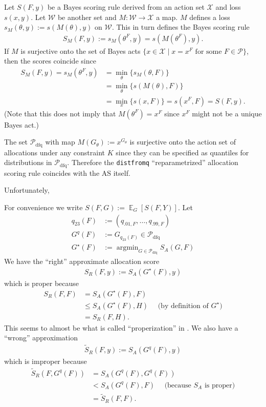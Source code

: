 \documentclass{article}
\DeclareMathOperator*{\argmin}{argmin}
\DeclareMathOperator{\Ex}{\mathbb{E}}
\begin{document}
Let $S(F,y)$ be a Bayes scoring rule derived from an action set $\mathcal{X}$ and loss $s(x,y)$.
Let $\mathcal{W}$ be another set and $M:\mathcal{W} \to \mathcal{X}$ a map. $M$ defines a loss $s_M(\theta, y):= s(M(\theta), y)$
on $\mathcal{W}$. This in turn defines the Bayes scoring rule
\begin{align}
S_M(F,y) := s_M(\theta^F,y) = s(M(\theta^F),y).
\end{align}
If $M$ is surjective onto the set of Bayes acts $\{x \in \mathcal{X} \mid x = x^F \text{ for some } F \in \mathcal{P}\}$, then the scores coincide since
\begin{align}
S_M(F,y) = s_M(\theta^F,y) & = \min_{\theta}\{s_M(\theta,F)\} \\
&= \min_{\theta}\{s(M(\theta),F)\}  \\
&= \min_{x}\{s(x,F)\} = s(x^F,F) = S(F,y).
\end{align}
(Note that this does not imply that $M(\theta^F) = x^F$ since $x^F$ might not be a unique Bayes act.)

The set $\mathcal{P}_{\mathrm{dfq}}$ with map $M(G_{\theta}):= x^{G_{\theta}}$ is surjective onto the action set of allocations
under any constraint $K$ since they can be specified as quantiles for distributions in $\mathcal{P}_{\mathrm{dfq}}$.  Therefore
the \verb`distfromq` ``reparametrized'' allocation scoring rule coincides with the AS itself.

Unfortunately, 





For convenience we write $S(F,G) := \Ex_G[S(F,Y)]$. Let
\begin{align*}
q_{23}(F) &:= (q_{.01,F},\ldots,q_{.99,F}) \\
G^q(F) &:= G_{q_{23}(F)} \in \mathcal{P}_{\mathrm{dfq}} \\
G^{\star}(F) &:= \argmin_{G \in \mathcal{P}_{\mathrm{dfq}}} S_A(G,F)
\end{align*}
We have the ``right'' approximate allocation score
\begin{align*}
S_{R}(F,y):= S_A(G^{\star}(F),y)
\end{align*}
which is proper because 
\begin{align*}
S_R(F,F) &= S_A(G^{\star}(F), F) \\ 
&\leq S_A(G^{\star}(F), H) \quad \text{ (by definition of $G^{\star}$)} \\
&=S_R(F,H).
\end{align*}
This seems to almost be what is called ``properization'' in \cite{brehmer2020properization}.
We also have a ``wrong'' approximation 
\begin{align*}
\tilde{S}_R(F,y) := S_A(G^q(F),y)
\end{align*}
which is improper because
\begin{align*}
\tilde{S}_R(F,G^q(F)) &= S_A(G^q(F),G^q(F)) \\
 &<  S_A(G^q(F),F) \quad \text{ (because $S_A$ is proper)} \\
 &= \tilde{S}_R(F,F).
\end{align*}






\end{document}
